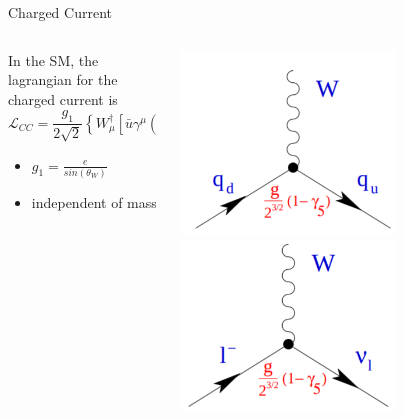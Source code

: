 \begin{frame}{Charged Current \footnotemark }
    \begin{columns}
        \begin{column}{0.65\textwidth}
            In the SM, the lagrangian for the charged current is 
    \begin{equation*}
        \mathcal{L}_{CC} = \frac{g_1}{2 \sqrt{2}}  \left\{ W^{\dagger}_\mu \left[ \bar{u} \gamma^\mu (1-\gamma^5) d + \bar{\nu}_e \gamma^{\mu} (1-\gamma^5) e \right] \right\}
    \end{equation*}
    \begin{itemize}
        \item $g_1 = \frac{e}{sin{(\theta_W)}}$
        \item independent of mass
    \end{itemize}
        \end{column}
        \begin{column}{0.35\textwidth}
            \includegraphics[width = 0.65\textwidth]{content/images/cc1.png}
            \includegraphics[width = 0.65\textwidth]{content/images/cc2.png}
        \end{column}
    \end{columns}
\end{frame}

